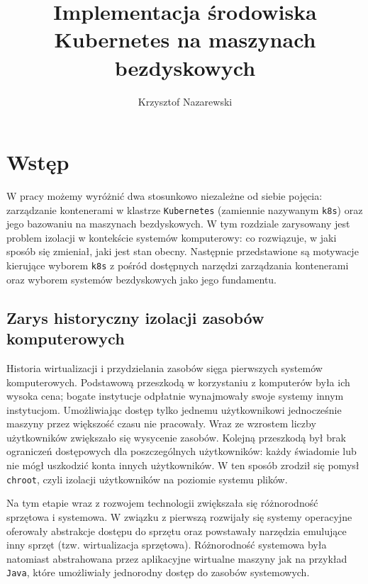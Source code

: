\documentclass[a4paper,12pt,twoside,openany]{report}
\title{Implementacja środowiska Kubernetes na maszynach bezdyskowych}
\author{Krzysztof Nazarewski}
\newcommand{\passthrough}[1]{#1}
\begin{document}
\maketitle
\hypertarget{wstux119p}{%
\chapter{Wstęp}\label{wstux119p}}

W pracy możemy wyróżnić dwa stosunkowo niezależne od siebie pojęcia:
zarządzanie kontenerami w klastrze \passthrough{\lstinline!Kubernetes!}
(zamiennie nazywanym \passthrough{\lstinline!k8s!}) oraz jego bazowaniu
na maszynach bezdyskowych. W tym rozdziale zarysowany jest problem
izolacji w kontekście systemów komputerowy: co rozwiązuje, w jaki sposób
się zmieniał, jaki jest stan obecny. Następnie przedstawione są
motywacje kierujące wyborem \passthrough{\lstinline!k8s!} z pośród
dostępnych narzędzi zarządzania kontenerami oraz wyborem systemów
bezdyskowych jako jego fundamentu.

\hypertarget{zarys-historyczny-izolacji-zasobuxf3w-komputerowych}{%
\section{Zarys historyczny izolacji zasobów
komputerowych}\label{zarys-historyczny-izolacji-zasobuxf3w-komputerowych}}

Historia wirtualizacji i przydzielania zasobów sięga pierwszych systemów
komputerowych. Podstawową przeszkodą w korzystaniu z komputerów była ich
wysoka cena; bogate instytucje odpłatnie wynajmowały swoje systemy innym
instytucjom. Umożliwiając dostęp tylko jednemu użytkownikowi
jednocześnie maszyny przez większość czasu nie pracowały. Wraz ze
wzrostem liczby użytkowników zwiększało się wysycenie zasobów. Kolejną
przeszkodą był brak ograniczeń dostępowych dla poszczególnych
użytkowników: każdy świadomie lub nie mógł uszkodzić konta innych
użytkowników. W ten sposób zrodził się pomysł
\passthrough{\lstinline!chroot!}, czyli izolacji użytkowników na
poziomie systemu plików.

Na tym etapie wraz z rozwojem technologii zwiększała się różnorodność
sprzętowa i systemowa. W związku z pierwszą rozwijały się systemy
operacyjne oferowały abstrakcje dostępu do sprzętu oraz powstawały
narzędzia emulujące inny sprzęt (tzw. wirtualizacja sprzętowa).
Różnorodność systemowa była natomiast abstrahowana przez aplikacyjne
wirtualne maszyny jak na przykład \passthrough{\lstinline!Java!}, które
umożliwiały jednorodny dostęp do zasobów systemowych.
\end{document}
